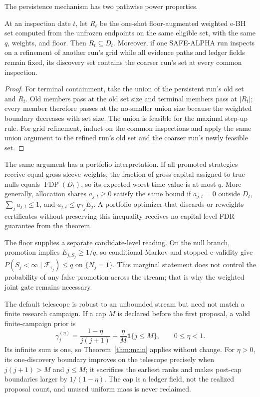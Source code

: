The persistence mechanism has two pathwise power properties.

\begin{proposition}
\label{prop:terminal-containment}
At an inspection date \(t\), let \(R_t\) be the one-shot floor-augmented
weighted e-BH set computed from the unfrozen endpoints on the same eligible
set, with the same \(q\), weights, and floor.  Then \(R_t\subseteq D_t\).
Moreover, if one SAFE-ALPHA run inspects on a refinement of another run's
grid while all evidence paths and ledger fields remain fixed, its discovery
set contains the coarser run's set at every common inspection.
\end{proposition}

\begin{proof}
For terminal containment, take the union of the persistent run's old set and
\(R_t\).  Old members pass at the old set size and terminal members pass at
\(|R_t|\); every member therefore passes at the no-smaller union size because
the weighted boundary decreases with set size.  The union is feasible for
the maximal step-up rule.  For grid refinement, induct on the common
inspections and apply the same union argument to the refined run's old set
and the coarser run's newly feasible set.
\end{proof}

The same argument has a portfolio interpretation.  If all promoted
strategies receive equal gross sleeve weights, the fraction of gross capital
assigned to true nulls equals \(\operatorname{FDP}(D_t)\), so its expected
worst-time value is at most \(q\).  More generally, allocation shares
\(a_{j,t}\ge0\) satisfy the same bound if \(a_{j,t}=0\) outside \(D_t\),
\(\sum_ja_{j,t}\le1\), and
\(a_{j,t}\le q\gamma_j\widetilde E_j\).  A portfolio optimizer that discards
or reweights certificates without preserving this inequality receives no
capital-level FDR guarantee from the theorem.

The floor supplies a separate candidate-level reading.  On the null branch,
promotion implies \(E_{j,S_j}\ge1/q\), so conditional Markov and stopped
e-validity give
\(P(S_j<\infty\mid\mathcal F_{\tau_j})\le q\) on \(\{N_j=1\}\).  This
marginal statement does
not control the probability of any false promotion across the stream; that is
why the weighted joint gate remains necessary.

The default telescope is robust to an unbounded stream but need not match a
finite research campaign.  If a cap \(M\) is declared before the first
proposal, a valid finite-campaign prior is
\begin{equation}
\gamma_j^{(\eta)}=
\frac{1-\eta}{j(j+1)}+\frac{\eta}{M}\mathbf1\{j\le M\},
\qquad 0\le\eta<1.
\label{eq:campaign}
\end{equation}
Its infinite sum is one, so Theorem~\ref{thm:main} applies without change.
For \(\eta>0\), its one-discovery boundary improves on the telescope precisely
when \(j(j+1)>M\) and \(j\le M\); it sacrifices the earliest ranks and makes
post-cap boundaries larger by \(1/(1-\eta)\).  The cap is a ledger field, not
the realized proposal count, and unused uniform mass is never reclaimed.

